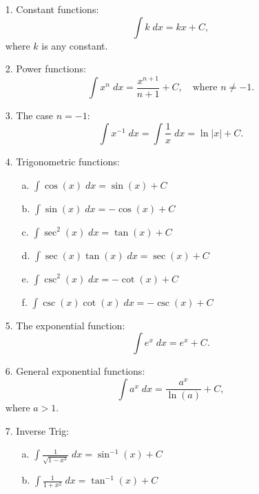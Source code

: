 \documentclass{ximera}
\begin{document}
\begin{enumerate}


\item[1.] Constant functions:
\[
\int k \; dx = kx + C,
\]
where $k$ is any constant.

\item[2.] Power functions:
\[
\int x^n \; dx = \frac{x^{n+1}}{n+1} + C, \quad \text{where $n\neq -1$.}
\]


\item[3.] The case $n = -1$:
\[
\int x^{-1} \; dx = \int \frac{1}{x} \; dx = \ln|x| + C.
\]

\item[4.] Trigonometric functions:

\begin{enumerate}

\item[a.] $\displaystyle{\int \cos(x) \; dx = \sin(x) + C}$
\item[b.] $\displaystyle{\int \sin(x) \; dx = -\cos(x) + C}$
\item[c.] $\displaystyle{\int \sec^2(x) \; dx = \tan(x) + C}$
\item[d.] $\displaystyle{\int \sec(x) \tan(x) \; dx = \sec(x) + C}$
\item[e.] $\displaystyle{\int \csc^2(x) \; dx = -\cot(x) + C}$
\item[f.] $\displaystyle{\int \csc(x) \cot(x) \; dx = -\csc(x) + C}$
 
\end{enumerate}


\item[5.] The exponential function:
\[
\int e^x \; dx = e^x + C.
\]

\item[6.] General exponential functions:
\[
\int a^x \; dx = \frac{a^x}{\ln(a)} + C,
\]
where $a > 1$.

\item[7.] Inverse Trig:

\begin{enumerate}

\item[a.] $\displaystyle{\int \frac{1}{\sqrt{1-x^2}} \; dx = \sin^{-1}(x) + C}$
\item[b.] $\displaystyle{\int \frac{1}{1+x^2} \; dx = \tan^{-1}(x) + C}$

\end{enumerate}


\end{enumerate}
\end{document}
